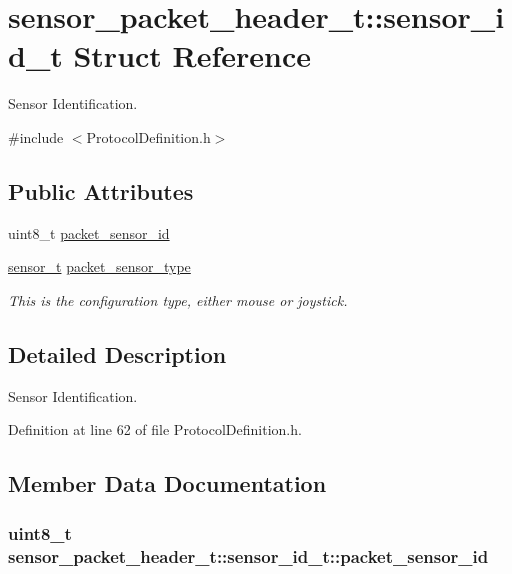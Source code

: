 \hypertarget{structsensor__packet__header__t_1_1sensor__id__t}{\section{sensor\-\_\-packet\-\_\-header\-\_\-t\-:\-:sensor\-\_\-id\-\_\-t \-Struct \-Reference}
\label{structsensor__packet__header__t_1_1sensor__id__t}
}


\-Sensor \-Identification.  




{\ttfamily \#include $<$\-Protocol\-Definition.\-h$>$}

\subsection*{\-Public \-Attributes}
\begin{DoxyCompactItemize}
\item 
uint8\-\_\-t \hyperlink{structsensor__packet__header__t_1_1sensor__id__t_a640c62783674692cd76fe826ec22640b}{packet\-\_\-sensor\-\_\-id}
\item 
\hyperlink{_protocol_definition_8h_a7db4018819078870576bf80126e7804d}{sensor\-\_\-t} \hyperlink{structsensor__packet__header__t_1_1sensor__id__t_ac75342f878e2f127ddd4217eb3857a0b}{packet\-\_\-sensor\-\_\-type}
\begin{DoxyCompactList}\small\item\em \-This is the configuration type, either mouse or joystick. \end{DoxyCompactList}\end{DoxyCompactItemize}


\subsection{\-Detailed \-Description}
\-Sensor \-Identification. 

\-Definition at line 62 of file \-Protocol\-Definition.\-h.



\subsection{\-Member \-Data \-Documentation}
\hypertarget{structsensor__packet__header__t_1_1sensor__id__t_a640c62783674692cd76fe826ec22640b}{
\subsubsection[{packet\-\_\-sensor\-\_\-id}]{\setlength{\rightskip}{0pt plus 5cm}uint8\-\_\-t {\bf sensor\-\_\-packet\-\_\-header\-\_\-t\-::sensor\-\_\-id\-\_\-t\-::packet\-\_\-sensor\-\_\-id}}}\label{structsensor__packet__header__t_1_1sensor__id__t_a640c62783674692cd76fe826ec22640b}


